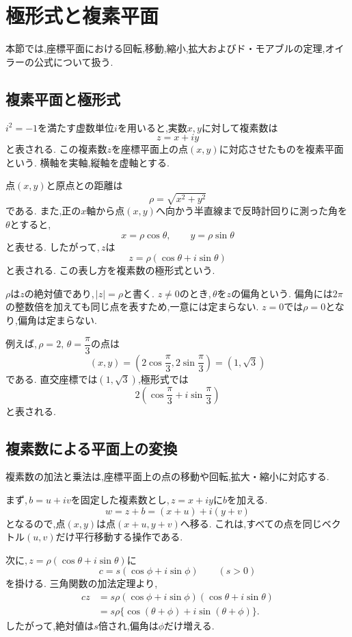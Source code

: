 
\section{極形式と複素平面}\label{節：極形式と複素平面}
本節では,座標平面における回転,移動,縮小,拡大およびド・モアブルの定理,オイラーの公式について扱う.

  \subsection{複素平面と極形式}\label{節：複素平面と極形式}
    $i^2=-1$を満たす虚数単位$i$を用いると,実数$x,y$に対して複素数は
    \[
      z=x+iy
    \]
    と表される.
    この複素数$z$を座標平面上の点$(x,y)$に対応させたものを複素平面という.
    横軸を実軸,縦軸を虚軸とする.

    点$(x,y)$と原点との距離は
    \[
      \rho=\sqrt{x^2+y^2}
    \]
    である.
    また,正の$x$軸から点$(x,y)$へ向かう半直線まで反時計回りに測った角を$\theta$とすると,
    \[
      x=\rho\cos\theta,\qquad
      y=\rho\sin\theta
    \]
    と表せる.
    したがって,\,$z$は
    \[
      z=\rho(\cos\theta+i\sin\theta)
    \]
    と表される.
    この表し方を複素数の極形式という.

    $\rho$は$z$の絶対値であり,\,$|z|=\rho$と書く.
    $z\ne0$のとき,\,$\theta$を$z$の偏角という.
    偏角には$2\pi$の整数倍を加えても同じ点を表すため,一意には定まらない.
    $z=0$では$\rho=0$となり,偏角は定まらない.

    例えば,\,$\rho=2,\,\theta=\dfrac{\pi}{3}$の点は
    \[
      (x,y)
      =
      \left(
        2\cos\frac{\pi}{3},
        2\sin\frac{\pi}{3}
      \right)
      =
      (1,\sqrt{3})
    \]
    である.
    直交座標では$(1,\sqrt{3})$,極形式では
    \[
      2\left(
        \cos\frac{\pi}{3}
        +i\sin\frac{\pi}{3}
      \right)
    \]
    と表される.

  \subsection{複素数による平面上の変換}\label{節：複素数による平面上の変換}
    複素数の加法と乗法は,座標平面上の点の移動や回転,拡大・縮小に対応する.

    まず,\,$b=u+iv$を固定した複素数とし,\,$z=x+iy$に$b$を加える.
    \[
      w=z+b=(x+u)+i(y+v)
    \]
    となるので,点$(x,y)$は点$(x+u,y+v)$へ移る.
    これは,すべての点を同じベクトル$(u,v)$だけ平行移動する操作である.

    次に,\,$z=\rho(\cos\theta+i\sin\theta)$に
    \[
      c=s(\cos\phi+i\sin\phi)
      \qquad(s>0)
    \]
    を掛ける.
    三角関数の加法定理より,
    \begin{align*}
      cz
        &=s\rho
          (\cos\phi+i\sin\phi)
          (\cos\theta+i\sin\theta)\\
        &=s\rho
          \{\cos(\theta+\phi)+i\sin(\theta+\phi)\}.
    \end{align*}
    したがって,絶対値は$s$倍され,偏角は$\phi$だけ増える.

